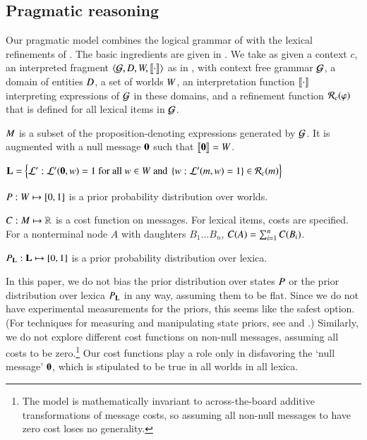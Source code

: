 \documentclass[leqno,12pt]{article}
\begin{document}

\subsection{Pragmatic reasoning}\label{sec:agents}

Our pragmatic model combines the logical grammar of
 with the lexical refinements of
. The basic ingredients are given in
. We take as given a context $c$, an interpreted
fragment $\langle \mathcal{G}, D, W, \llbracket\cdot\rrbracket \rangle$ as in
, with context free grammar $\mathcal{G}$, a domain
of entities $D$, a set of worlds $W$, an interpretation
function $\llbracket\cdot\rrbracket$ interpreting expressions of $\mathcal{G}$ in these
domains, and a refinement function $\mathcal{R}_{c}(\varphi)$ that is defined
for all lexical items in $\mathcal{G}$.
%
\begin{examples}
\item\label{modobjects}
  \begin{examples}
  \item\label{messages} $M$ is a subset of the
    proposition-denoting expressions generated by $\mathcal{G}$. It is
    augmented with a null message $\mathbf{0}$ such that
    $\llbracket\mathbf{0}\rrbracket = W$.

  \item\label{lexset}%
    $\mathbf{L} = \Big\{ \mathcal{L}' : \mathcal{L}'(\mathbf{0}, w) = 1 \text{ for all } w \in W \text{ and } \left\{ w : \mathcal{L}'(m, w)=1 \right\} \in \mathcal{R}_{c}(m) \Big\}$             
  
  \item $P : W \mapsto [0,1]$ is a prior probability
    distribution over worlds.

  \item $C : M \mapsto \mathbb{R}$ is a cost function on
    messages.  For lexical items, costs are specified. For a
    nonterminal node $A$ with daughters $B_{1} \ldots B_{n}$,
    $C(A) = \sum_{i=1}^{n}C(B_{i})$.

  \item $P_{\mathbf{L}} : \mathbf{L} \mapsto [0,1]$ is a prior probability
    distribution over lexica.
  \end{examples}
\end{examples}

In this paper, we do not bias the prior distribution over states
$P$ or the prior distribution over lexica $P_{\mathbf{L}}$ in any
way, assuming them to be flat. Since we do not have experimental
measurements for the priors, this seems like the safest option. (For
techniques for measuring and manipulating state priors, see
\citealt{Frank:Goodman:2012} and
\citealt{Stiller:Goodman:Frank:2011}.)  Similarly, we do not explore
different cost functions on non-null messages, assuming all costs to
be zero.\footnote{The model is mathematically invariant to
  across-the-board additive transformations of message costs, so
  assuming all non-null messages to have zero cost loses no
  generality.} Our cost functions play a role only in disfavoring the
`null message' $\mathbf{0}$, which is stipulated to be true in all
worlds in all lexica.
\end{document}

